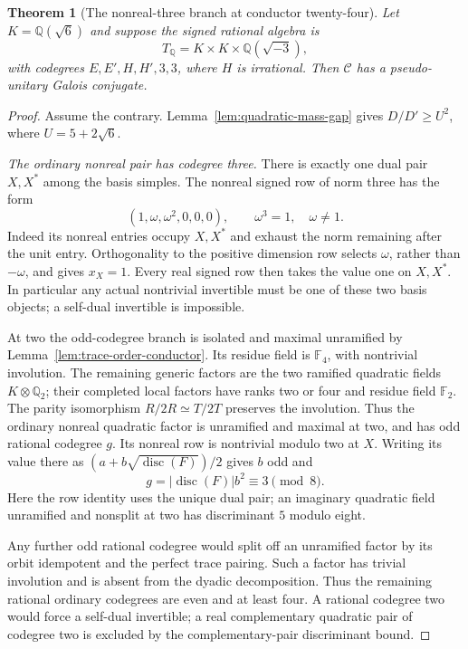 \documentclass[11pt,reqno]{amsart}
\newtheorem{theorem}{Theorem}[section]
\theoremstyle{remark}\newtheorem{remark}[theorem]{Remark}
\numberwithin{equation}{section}
\begin{document}
\begin{theorem}[The nonreal-three branch at conductor twenty-four]
\label{thm:r6-twenty-four-imaginary}
Let $K=\mathbb Q(\sqrt6)$ and suppose the signed rational algebra is
\[
 T_{\mathbb Q}=K\times K\times\mathbb Q(\sqrt{-3}),
\]
with codegrees $E,E',H,H',3,3$, where $H$ is irrational.
Then $\mathcal C$ has a pseudo-unitary Galois conjugate.
\end{theorem}
\begin{proof}
Assume the contrary. Lemma~\ref{lem:quadratic-mass-gap} gives
$D/D'\ge U^2$, where $U=5+2\sqrt6$.

\smallskip\noindent\emph{The ordinary nonreal pair has codegree three.}
There is exactly one dual pair $X,X^*$ among the basis simples.
The nonreal signed row of norm three has the form
\[
 (1,\omega,\omega^2,0,0,0),\qquad \omega^3=1,\quad\omega\ne1.
\]
Indeed its nonreal entries occupy $X,X^*$ and exhaust the norm
remaining after the unit entry.
Orthogonality to the positive dimension row selects $\omega$,
rather than $-\omega$, and gives $x_X=1$.
Every real signed row then takes the value one on $X,X^*$.
In particular any actual nontrivial invertible must be one of
these two basis objects; a self-dual invertible is impossible.

At two the odd-codegree branch is isolated and maximal unramified
by Lemma~\ref{lem:trace-order-conductor}. Its residue field is
$\mathbb F_4$, with nontrivial involution.
The remaining generic factors are the two ramified quadratic
fields $K\otimes\mathbb Q_2$; their completed local factors have
ranks two or four and residue field $\mathbb F_2$.
The parity isomorphism $R/2R\simeq T/2T$ preserves the involution.
Thus the ordinary nonreal quadratic factor is unramified and
maximal at two, and has odd rational codegree $g$.
Its nonreal row is nontrivial modulo two at $X$.
Writing its value there as $(a+b\sqrt{\operatorname{disc}(F)})/2$
gives $b$ odd and
\[
 g=|\operatorname{disc}(F)|b^2\equiv3\pmod8.
\]
Here the row identity uses the unique dual pair; an imaginary
quadratic field unramified and nonsplit at two has discriminant
$5$ modulo eight.

Any further odd rational codegree would split off an unramified
factor by its orbit idempotent and the perfect trace pairing. Such a
factor has trivial involution and is absent from the dyadic decomposition.
Thus the remaining rational ordinary codegrees are even and
at least four.
A rational codegree two would force a self-dual invertible; a
real complementary quadratic pair of codegree two is excluded
by the complementary-pair discriminant bound.


\end{proof}
\end{document}
